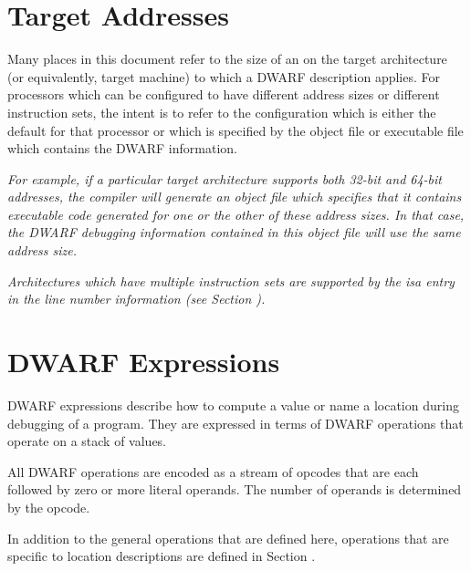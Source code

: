 \section{Target Addresses}
\label{chap:targetaddresses}
Many places in this document refer to the size of an
on the target architecture (or equivalently, target machine)
to which a DWARF description applies. For processors which
can be configured to have different address sizes or different
instruction sets, the intent is to refer to the configuration
which is either the default for that processor or which is
specified by the object file or executable file which contains
the DWARF information.

\textit{%
For example, if a particular target architecture supports
both 32-bit and 64-bit addresses, the compiler will generate
an object file which specifies that it contains executable
code generated for one or the other of these 
address sizes. In
that case, the DWARF debugging information contained in this
object file will use the same address size.
}

\textit{%
Architectures which have multiple instruction sets are
supported by the isa entry in the line number information
(see Section ).
}

\section{DWARF Expressions}
\label{chap:dwarfexpressions}
DWARF expressions describe how to compute a value or name a
location during debugging of a program. 
They are expressed in
terms of DWARF operations that operate on a stack of values.

All DWARF operations are encoded as a stream of opcodes that
are each followed by zero or more literal operands. 
The number
of operands is determined by the opcode.  

In addition to the
general operations that are defined here, operations that are
specific to location descriptions are defined in 
Section .

